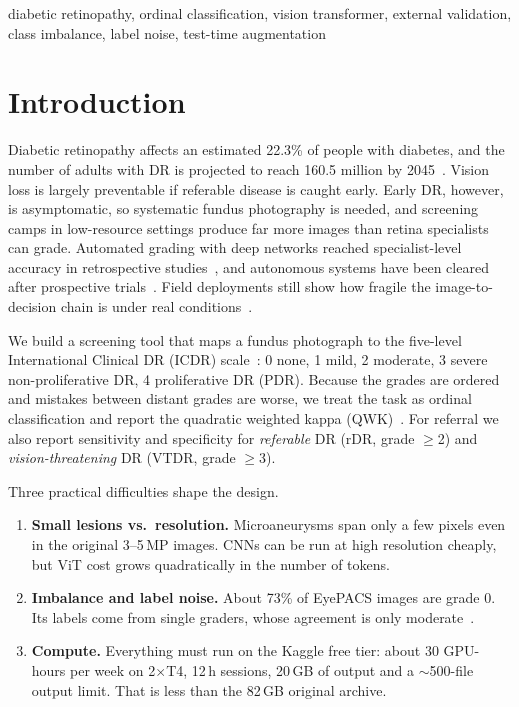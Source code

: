 \documentclass[conference,a4paper]{IEEEtran}
\begin{document}
\begin{IEEEkeywords}
diabetic retinopathy, ordinal classification, vision transformer, external validation, class imbalance, label noise, test-time augmentation
\end{IEEEkeywords}

\section{Introduction}
Diabetic retinopathy affects an estimated 22.3\% of people with diabetes, and the number of adults with DR is projected to reach 160.5 million by 2045~\cite{teo}.
Vision loss is largely preventable if referable disease is caught early.
Early DR, however, is asymptomatic, so systematic fundus photography is needed, and screening camps in low-resource settings produce far more images than retina specialists can grade.
Automated grading with deep networks reached specialist-level accuracy in retrospective studies~\cite{gulshan,krause}, and autonomous systems have been cleared after prospective trials~\cite{abramoff}.
Field deployments still show how fragile the image-to-decision chain is under real conditions~\cite{beede}.

We build a screening tool that maps a fundus photograph to the five-level International Clinical DR (ICDR) scale~\cite{icdr}: 0 none, 1 mild, 2 moderate, 3 severe non-proliferative DR, 4 proliferative DR (PDR).
Because the grades are ordered and mistakes between distant grades are worse, we treat the task as ordinal classification and report the quadratic weighted kappa (QWK)~\cite{cohen}.
For referral we also report sensitivity and specificity for \emph{referable} DR (rDR, grade $\ge$2) and \emph{vision-threatening} DR (VTDR, grade $\ge$3).

Three practical difficulties shape the design.
\begin{enumerate}
\item \textbf{Small lesions vs.\ resolution.} Microaneurysms span only a few pixels even in the original 3--5\,MP images. CNNs can be run at high resolution cheaply, but ViT cost grows quadratically in the number of tokens.
\item \textbf{Imbalance and label noise.} About 73\% of EyePACS images are grade 0. Its labels come from single graders, whose agreement is only moderate~\cite{krause}.
\item \textbf{Compute.} Everything must run on the Kaggle free tier: about 30 GPU-hours per week on 2$\times$T4, 12\,h sessions, 20\,GB of output and a $\sim$500-file output limit. That is less than the 82\,GB original archive.
\end{enumerate}
\end{document}
